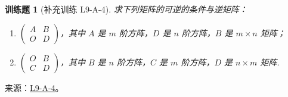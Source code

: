\documentclass[UTF8,12pt,a4paper,fontset=fandol]{ctexart}
\newtheorem{exercise}{训练题}[section]
\begin{document}
\begin{exercise}[补充训练 L9-A-4]\label{prob:L9-A-4}
求下列矩阵的可逆的条件与逆矩阵：
            \begin{enumerate}
                \item $\begin{pmatrix}
                        A & B \\ O & D
                    \end{pmatrix}$，其中 $A$ 是 $m$ 阶方阵，$D$ 是 $n$ 阶方阵，$B$ 是 $m \times n$ 矩阵；

                \item $\begin{pmatrix}
                        O & B \\ C & D
                    \end{pmatrix}$，其中 $B$ 是 $n$ 阶方阵，$C$ 是 $m$ 阶方阵，$D$ 是 $n \times m$ 矩阵.
            \end{enumerate}
\end{exercise}
\noindent 来源：\href{https://github.com/yhwu-is/Linear-Algebra-Left-Undone/blob/new/%E8%AE%B2%E4%B9%89/%E4%B8%93%E9%A2%98/9%20%E7%9F%A9%E9%98%B5%E8%BF%90%E7%AE%97%E8%BF%9B%E9%98%B6.tex}{L9-A-4}。
\end{document}
